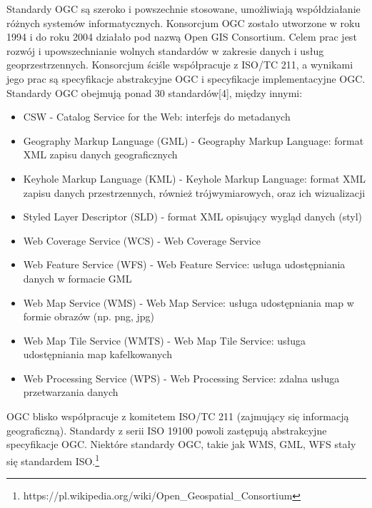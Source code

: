 Standardy OGC są szeroko i powszechnie stosowane, umożliwiają współdziałanie różnych systemów informatycznych.
Konsorcjum OGC zostało utworzone w roku 1994 i do roku 2004 działało pod nazwą Open GIS Consortium. Celem prac jest rozwój i upowszechnianie wolnych standardów w zakresie danych i usług geoprzestrzennych. Konsorcjum ściśle współpracuje z ISO/TC 211, a wynikami jego prac są specyfikacje abstrakcyjne OGC i specyfikacje implementacyjne OGC.
Standardy OGC obejmują ponad 30 standardów[4], między innymi:
\begin{itemize}
	\item CSW - Catalog Service for the Web: interfejs do metadanych
	\item Geography Markup Language (GML) - Geography Markup Language: format XML zapisu danych geograficznych
	\item Keyhole Markup Language (KML) - Keyhole Markup Language: format XML zapisu danych przestrzennych, również trójwymiarowych, oraz ich wizualizacji
	\item Styled Layer Descriptor (SLD) - format XML opisujący wygląd danych (styl)
	\item Web Coverage Service (WCS) - Web Coverage Service
	\item Web Feature Service (WFS) - Web Feature Service: usługa udostępniania danych w formacie GML
	\item Web Map Service (WMS) - Web Map Service: usługa udostępniania map w formie obrazów (np. png, jpg)
	\item Web Map Tile Service (WMTS) - Web Map Tile Service: usługa udostępniania map kafelkowanych
	\item Web Processing Service (WPS) - Web Processing Service: zdalna usługa przetwarzania danych
\end{itemize}
OGC blisko współpracuje z komitetem ISO/TC 211 (zajmujący się informacją geograficzną). Standardy z serii ISO 19100 powoli zastępują abstrakcyjne specyfikacje OGC. Niektóre standardy OGC, takie jak WMS, GML, WFS stały się standardem ISO.\footnote{https://pl.wikipedia.org/wiki/Open\_Geospatial\_Consortium}



